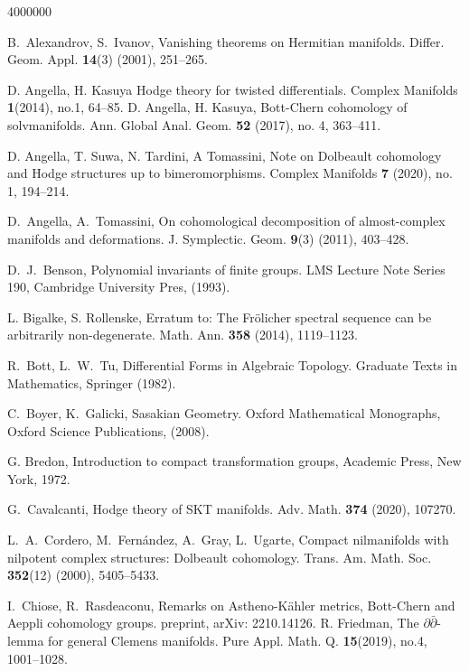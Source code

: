 \documentclass[12pt,reqno]{amsart}
\theoremstyle{definition}
\begin{document}
\newpage
\begin{thebibliography}{4000000}

 B.~Alexandrov, S.~Ivanov, Vanishing theorems on Hermitian manifolds. Differ. Geom. Appl. {\bf 14}(3) (2001), 251--265.

D.  Angella,  H.  Kasuya
Hodge theory for twisted differentials.
Complex Manifolds {\bf 1}(2014), no.1, 64--85.
D.  Angella,  H.  Kasuya, Bott-Chern cohomology of solvmanifolds. Ann. Global Anal. Geom. {\bf 52} (2017), no. 4, 363--411.

D. Angella, T.  Suwa, N. Tardini, A Tomassini, 
 Note on Dolbeault cohomology and Hodge structures up to bimeromorphisms. Complex Manifolds {\bf 7} (2020), no. 1, 194--214.

 D.~Angella, A.~Tomassini, On cohomological decomposition of almost-complex manifolds and deformations. J. Symplectic. Geom. {\bf 9}(3) (2011), 403--428.

 D.~J.~Benson, Polynomial invariants of finite groups. LMS Lecture Note Series 190, Cambridge University Pres, (1993).

 L. Bigalke, S. Rollenske, Erratum to: The Fr\"olicher spectral sequence can be arbitrarily non-degenerate. Math. Ann. {\bf 358} (2014), 1119--1123.

 R.~Bott, L.~W.~Tu, Differential Forms in Algebraic Topology. Graduate Texts in Mathematics, Springer (1982).

 C.~Boyer, K.~Galicki, Sasakian Geometry. Oxford Mathematical Monographs, Oxford Science Publications, (2008).

G. Bredon, Introduction to compact transformation groups, Academic Press, New York, 1972. 

 G.~Cavalcanti, Hodge theory of SKT manifolds. Adv. Math. {\bf 374} (2020), 107270.

 L.~A.~Cordero, M.~Fern\'andez, A.~Gray, L.~Ugarte, Compact nilmanifolds with nilpotent complex structures: Dolbeault cohomology. Trans. Am. Math. Soc. {\bf352}(12) (2000), 5405--5433.


I.~Chiose, R.~Rasdeaconu, Remarks on Astheno-K\"ahler metrics, Bott-Chern and Aeppli cohomology groups. preprint, arXiv: 2210.14126.
R. Friedman, 
The  $\partial\bar\partial$-lemma for general Clemens manifolds.
Pure Appl. Math. Q. {\bf 15}(2019), no.4, 1001--1028.


\end{thebibliography}
\end{document}
